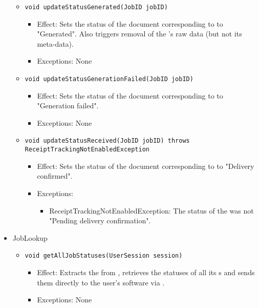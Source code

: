 \begin{itemize}
\begin{itemize}
		\item \texttt{void updateStatusGenerated(JobID jobID)}
		\begin{itemize}
            \item Effect: Sets the status of the document corresponding to  to "Generated". Also triggers removal of the 's raw data (but not its meta-data).
            \item Exceptions: None
        \end{itemize}

		\item \texttt{void updateStatusGenerationFailed(JobID jobID)}
		\begin{itemize}
            \item Effect: Sets the status of the document corresponding to  to "Generation failed".
            \item Exceptions: None
        \end{itemize}

		\item \texttt{void updateStatusReceived(JobID jobID) throws ReceiptTrackingNotEnabledException}
		\begin{itemize}
            \item Effect: Sets the status of the document corresponding to  to "Delivery confirmed".
            \item Exceptions:
			\begin{itemize}
				\item ReceiptTrackingNotEnabledException: The status of the  was not "Pending delivery confirmation".
			\end{itemize}
        \end{itemize}
    \end{itemize}

	\item JobLookup
    \begin{itemize}
        \item \texttt{void getAllJobStatuses(UserSession session)}
        \begin{itemize}
            \item Effect: Extracts the  from , retrieves the statuses of all its s and sends them directly to the user's software via .
            \item Exceptions: None
        \end{itemize}
    \end{itemize}
\end{itemize}

